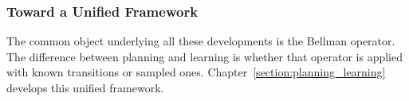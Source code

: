 \subsubsection{Toward a Unified Framework}

The common object underlying all these developments is the Bellman operator. The difference between planning and learning is whether that operator is applied with known transitions or sampled ones. Chapter~\ref{section:planning_learning} develops this unified framework.
